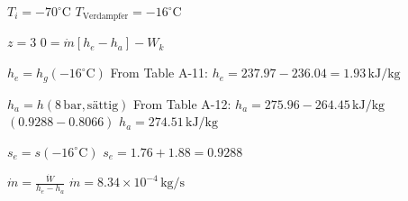 \( T_i = -70^\circ \text{C} \)  
\( T_{\text{Verdampfer}} = -16^\circ \text{C} \)  

\( z = 3 \)  
\( 0 = \dot{m} [h_e - h_a] - W_k \)  

\( h_e = h_{g}(-16^\circ \text{C}) \)  
From Table A-11:  
\( h_e = 237.97 - 236.04 = 1.93 \, \text{kJ/kg} \)  

\( h_a = h(8 \, \text{bar}, \text{sättig}) \)  
From Table A-12:  
\( h_a = 275.96 - 264.45 \, \text{kJ/kg} \)  
\( (0.9288 - 0.8066) \)  
\( h_a = 274.51 \, \text{kJ/kg} \)  

\( s_e = s(-16^\circ \text{C}) \)  
\( s_e = 1.76 + 1.88 = 0.9288 \)  

\( \dot{m} = \frac{\dot{W}}{h_e - h_a} \)  
\( \dot{m} = 8.34 \times 10^{-4} \, \text{kg/s} \)